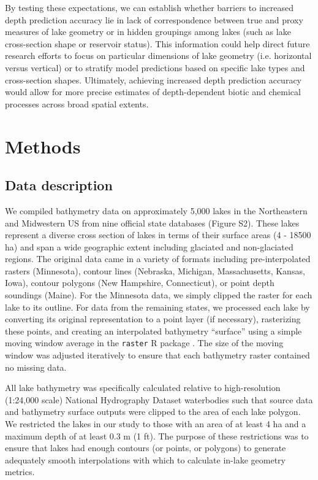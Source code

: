 \documentclass[draft]{agujournal2019}
\begin{document}
By testing these expectations, we can establish whether barriers to increased depth prediction accuracy lie in lack of correspondence between true and proxy measures of lake geometry or in hidden groupings among lakes (such as lake cross-section shape or reservoir status). This information could help direct future research efforts to focus on particular dimensions of lake geometry (i.e. horizontal versus vertical) or to stratify model predictions based on specific lake types and cross-section shapes. Ultimately, achieving increased depth prediction accuracy would allow for more precise estimates of depth-dependent biotic and chemical processes across broad spatial extents.

\section{Methods}
\subsection{Data description}
\noindent
We compiled bathymetry data on approximately 5,000 lakes in the Northeastern and Midwestern US from nine official state databases (Figure S2). These lakes represent a diverse cross section of lakes in terms of their surface areas (4 - 18500 ha) and span a wide geographic extent including glaciated and non-glaciated regions. The original data came in a variety of formats including pre-interpolated rasters (Minnesota), contour lines (Nebraska, Michigan, Massachusetts, Kansas, Iowa), contour polygons (New Hampshire, Connecticut), or point depth soundings (Maine). For the Minnesota data, we simply clipped the raster for each lake to its outline. For data from the remaining states, we processed each lake by converting its original representation to a point layer (if necessary), rasterizing these points, and creating an interpolated bathymetry “surface” using a simple moving window average in the \texttt{raster} R package \cite{hijmansRasterGeographicData2019}. The size of the moving window was adjusted iteratively to ensure that each bathymetry raster contained no missing data.

All lake bathymetry was specifically calculated relative to high-resolution (1:24,000 scale) National Hydrography Dataset \cite{usgsNationalHydrographyDataset2019} waterbodies such that source data and bathymetry surface outputs were clipped to the area of each lake polygon. We restricted the lakes in our study to those with an area of at least 4 ha and a maximum depth of at least 0.3 m (1 ft). The purpose of these restrictions was to ensure that lakes had enough contours (or points, or polygons) to generate adequately smooth interpolations with which to calculate in-lake geometry metrics.
\end{document}
